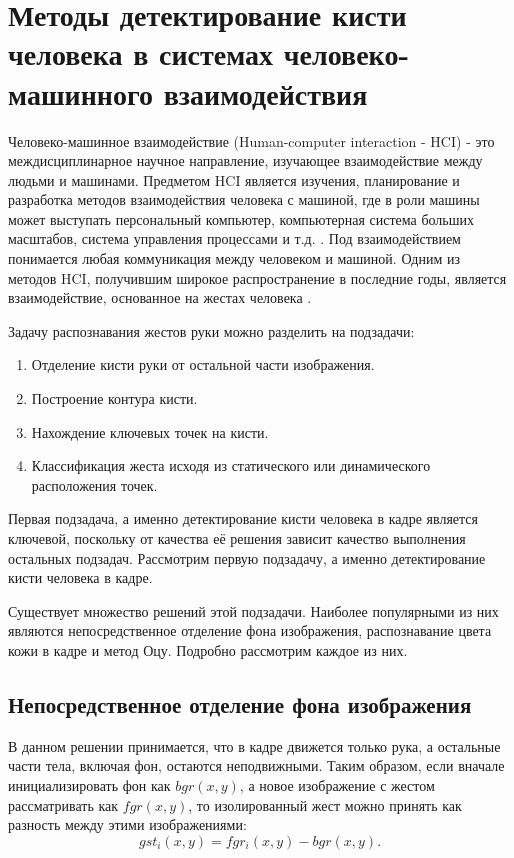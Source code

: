 \section{Методы детектирование кисти человека в системах человеко-машинного взаимодействия}

Человеко-машинное взаимодействие (Human-computer interaction - HCI) - это междисциплинарное
научное направление, изучающее взаимодействие между людьми и машинами. Предметом HCI является
изучения, планирование и разработка методов взаимодействия человека с машиной, где в роли машины
может выступать персональный компьютер, компьютерная система больших масштабов, система 
управления процессами и т.д. \cite{dix}. Под взаимодействием понимается любая коммуникация между
человеком и машиной. Одним из методов HCI, получившим широкое распространение в последние годы,
является взаимодействие, основанное на жестах человека \cite{jiangqin, sanna}. 

Задачу распознавания жестов руки можно разделить на подзадачи:
\begin{enumerate}
	\item Отделение кисти руки от остальной части изображения.
	\item Построение контура кисти.
	\item Нахождение ключевых точек на кисти.
	\item Классификация жеста исходя из статического или динамического расположения точек.
\end{enumerate}

Первая подзадача, а именно детектирование кисти человека в кадре является ключевой, поскольку
от качества её решения зависит качество выполнения остальных подзадач.
Рассмотрим первую подзадачу, а именно детектирование кисти человека в кадре.

Существует множество решений этой подзадачи. Наиболее популярными из них являются 
непосредственное отделение фона изображения, распознавание цвета 
кожи в кадре и метод Оцу. 
Подробно рассмотрим каждое из них.

\subsection{Непосредственное отделение фона изображения}

В данном решении принимается, что в кадре движется только рука, а остальные части
тела, включая фон, остаются неподвижными. Таким образом, если вначале инициализировать фон как
$bgr(x, y)$, а новое изображение с жестом рассматривать как $fgr(x, y)$, то изолированный жест
можно принять как разность между этими изображениями: 
\begin{equation} gst_i(x,y)=fgr_i(x,y)-bgr(x,y). \label{first}\end{equation}

